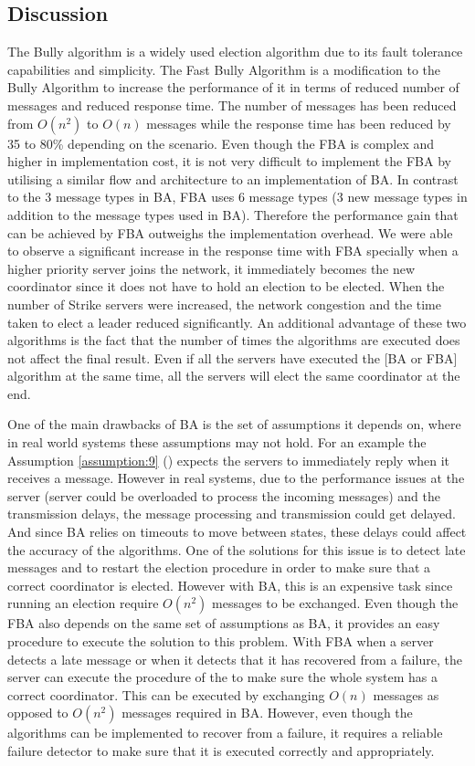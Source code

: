 \documentclass[dareport.tex]{subfiles}
\begin{document}
\subsection{Discussion}
The Bully algorithm is a widely used election algorithm due to its fault tolerance capabilities and simplicity. The Fast Bully Algorithm is a modification to the Bully Algorithm to increase the performance of it in terms of reduced number of messages and reduced response time. The number of messages has been reduced from $ O(n^2) $ to $ O(n) $ messages while the response time has been reduced by 35 to 80\% depending on the scenario. Even though the FBA is complex and higher in implementation cost, it is not very difficult to implement the FBA by utilising a similar flow and architecture to an implementation of BA. In contrast to the 3 message types in BA, FBA uses 6 message types (3 new message types in addition to the message types used in BA). Therefore the performance gain that can be achieved by FBA outweighs the implementation overhead. We were able to observe a significant increase in the response time with FBA specially when a higher priority server joins the network, it immediately becomes the new coordinator since it does not have to hold an election to be elected. When the number of Strike servers were increased, the network congestion and the time taken to elect a leader reduced significantly. An additional advantage of these two algorithms is the fact that the number of times the algorithms are executed does not affect the final result. Even if all the servers have executed the [BA or FBA] algorithm at the same time, all the servers will elect the same coordinator at the end.

One of the main drawbacks of BA is the set of assumptions it depends on, where in real world systems these assumptions may not hold. For an example the Assumption \ref{assumption:9} () expects the servers to immediately reply when it receives a message. However in real systems, due to the performance issues at the server (server could be overloaded to process the incoming messages) and the transmission delays, the message processing and transmission could get delayed. And since BA relies on timeouts to move between states, these delays could affect the accuracy of the algorithms. One of the solutions for this issue is to detect late messages and to restart the election procedure in order to make sure that a correct coordinator is elected. However with BA, this is an expensive task since running an election require $ O(n^2) $ messages to be exchanged. Even though the FBA also depends on the same set of assumptions as BA, it provides an easy procedure to execute the solution to this problem. With FBA when a server detects a late message or when it detects that it has recovered from a failure, the server can execute the  procedure of the  to make sure the whole system has a correct coordinator. This can be executed by exchanging $ O(n) $ messages as opposed to $ O(n^2) $ messages required in BA. However, even though the algorithms can be implemented to recover from a failure, it requires a reliable failure detector to make sure that it is executed correctly and appropriately.
\end{document}
